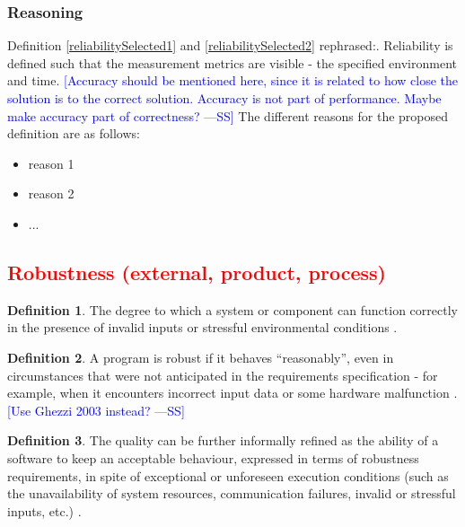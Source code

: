 \documentclass[letterpaper, cleveref]{lipics-v2019}
\newcommand{\authornote}[3]{\textcolor{#1}{[#3 ---#2]}}
\newcommand{\authornote}[3]{}
\newcommand{\wss}[1]{\authornote{blue}{SS}{#1}} %
\newcommand{\pmi}[1]{\authornote{green}{PM}{#1}} %
\newcommand{\notdone}[1]{\textcolor{red}{#1}}
\theoremstyle{definition}
\newtheorem{defn}{Definition}
\begin{document}
\subsubsection*{Reasoning}

Definition \ref{reliabilitySelected1} and \ref{reliabilitySelected2} rephrased:.
Reliability is defined such that the measurement metrics are visible - the
specified environment and time.   \wss{Accuracy should be mentioned here, since
it is related to how close the solution is to the correct solution.  Accuracy is
not part of performance.  Maybe make accuracy part of correctness?}  The
different reasons for the proposed definition are as follows:

\begin{itemize}
  \item reason 1
  \item reason 2
  \item ...
\end{itemize}


\subsection{\notdone{Robustness (external, product, process)}} %

\begin{defn}
	The degree to which a system or component can function correctly in the
	presence of invalid inputs or stressful environmental conditions
	\citep{IEEEStdGlossarySET1990}.
\end{defn}

\begin{defn} \label{RobustnessDefnSelected}
	A program is robust if it behaves ``reasonably'', even in circumstances that
	were not anticipated in the requirements specification - for example, when it
	encounters incorrect input data or some hardware malfunction
	\citep{ghezzi1991fundamentals}. \wss{Use Ghezzi 2003 instead?}
\end{defn}

\begin{defn}
	The quality can be further informally refined as the ability of a software
  to keep an acceptable behaviour, expressed in terms of robustness
  requirements, in spite of exceptional or unforeseen execution conditions
  (such as the unavailability of system resources, communication failures,
  invalid or stressful inputs, etc.) \citep{fernandez2005model}.
\end{defn}
\end{document}
